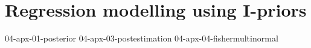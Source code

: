 \documentclass[a4paper,showframe,11pt]{report}
\begin{document}
\hPrintBibliography

\appendix
\chapter{Regression modelling using I-priors}
{04-apx-01-posterior}
{04-apx-03-postestimation}
{04-apx-04-fishermultinormal}

\printindex
\end{document}
